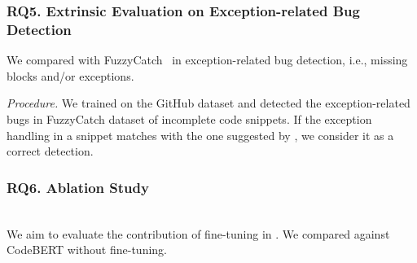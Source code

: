 





%


\subsubsection{RQ5. Extrinsic Evaluation on Exception-related Bug Detection}
 We compared with
FuzzyCatch~\cite{xrank-fse20} in exception-related
bug detection, i.e., missing  blocks and/or exceptions.



{\em Procedure.} We trained {\tool} on the GitHub dataset and detected
the exception-related bugs in FuzzyCatch dataset of incomplete
code snippets. If the exception handling in a snippet matches with
the one suggested by {\tool}, we consider it as a correct detection.



\subsubsection{RQ6. Ablation Study}~\\
We aim to evaluate the contribution of fine-tuning in {\tool}. We
compared {\tool} against CodeBERT without fine-tuning.
